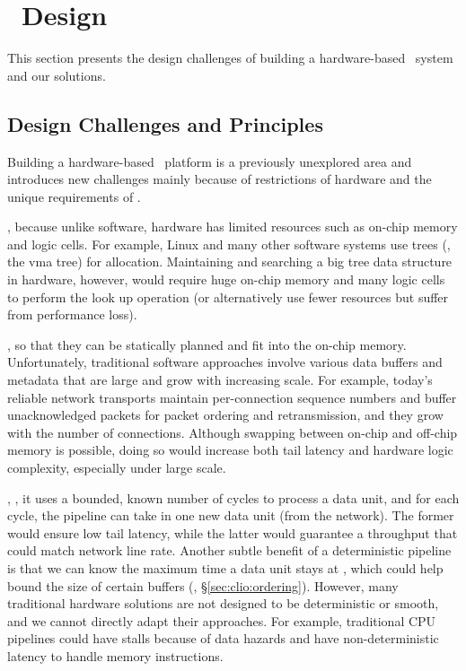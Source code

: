 \section{\sys\ Design}
\label{sec:clio:design}

This section presents the design challenges of building a hardware-based \md\ system and our solutions.

\subsection{Design Challenges and Principles}
Building a hardware-based \md\ platform is a previously unexplored area and introduces new challenges mainly because of restrictions of hardware and the unique requirements of \md.


, because unlike software, hardware has limited resources such as on-chip memory and logic cells.
For example, Linux and many other software systems use trees (\eg, the vma tree) for allocation.
Maintaining and searching a big tree data structure in hardware, however, would require huge on-chip memory and many logic cells to perform the look up operation (or alternatively use fewer resources but suffer from performance loss).


, so that they can be statically planned and fit into the on-chip memory.
Unfortunately, traditional software approaches 
involve various data buffers and metadata that are large and grow with increasing scale.
For example, today's reliable network transports maintain per-connection sequence numbers and buffer unacknowledged packets for packet ordering and retransmission, and they grow with the number of connections.
Although swapping between on-chip and off-chip memory is possible, doing so would increase both tail latency and hardware logic complexity, especially under large scale.


,
\ie, it uses a bounded, known number of cycles to process a data unit, and for each cycle, the pipeline can take in one new data unit (from the network).
The former would ensure low tail latency, while the latter would guarantee a throughput that could match network line rate.
Another subtle benefit of a deterministic pipeline is that we can know the maximum time a data unit stays at \MN,
which could help bound the size of certain buffers (\eg, \S\ref{sec:clio:ordering}).
However, many traditional hardware solutions are not designed to be deterministic or smooth, and we cannot directly adapt their approaches.
For example, traditional CPU pipelines could have stalls because of data hazards and have non-deterministic latency to handle memory instructions.

